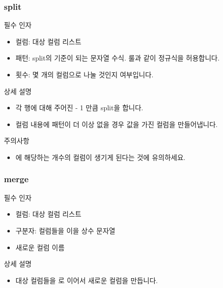 \documentclass[letterpaper,10pt,english]{sphinxmanual}
\begin{document}
\subsubsection{split}
\label{\detokenize{discovery/part07/rule_kinds:split}}
필수 인자
\begin{itemize}
\item {} 
컬럼: 대상 컬럼 리스트

\item {} 
패턴: split의 기준이 되는 문자열 수식. {\hyperref[\detokenize{discovery/part07/rule_kinds:replace}]{}} 룰과 같이 정규식을 허용합니다.

\item {} 
횟수: 몇 개의 컬럼으로 나눌 것인지 여부입니다.

\end{itemize}

상세 설명
\begin{itemize}
\item {} 
각 행에 대해 주어진  - 1 만큼 split을 합니다.

\item {} 
컬럼 내용에 패턴이 더 이상 없을 경우  값을 가진 컬럼을 만들어냅니다.

\end{itemize}

주의사항
\begin{itemize}
\item {} 
에 해당하는 개수의 컬럼이 생기게 된다는 것에 유의하세요.

\end{itemize}


\subsubsection{merge}
\label{\detokenize{discovery/part07/rule_kinds:merge}}
필수 인자
\begin{itemize}
\item {} 
컬럼: 대상 컬럼 리스트

\item {} 
구분자: 컬럼들을 이을 상수 문자열

\item {} 
새로운 컬럼 이름

\end{itemize}

상세 설명
\begin{itemize}
\item {} 
대상 컬럼들을 로 이어서 새로운 컬럼을 만듭니다.

\end{itemize}
\end{document}
